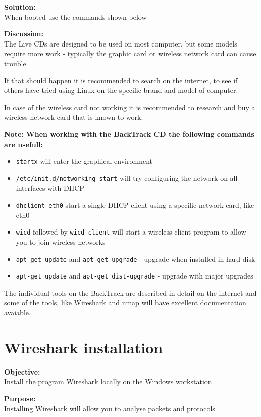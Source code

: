 \documentclass[a4paper,11pt,notitlepage]{report}
\begin{document}
{\bf Solution:}\\
When booted use the commands shown below

{\bf Discussion:}\\
The Live CDs are designed to be used on most computer, but some models
require more work - typically the graphic card or wireless network card can cause trouble.

If that should happen it is recommended to search on the internet, to see if others have tried using Linux on the specific brand and model of computer.

In case of the wireless card not working it is recommended to research and buy
a wireless network card that is known to work.

{\bf Note: When working with the BackTrack CD the following commands are usefull:}
\begin{itemize}
\item \verb+startx+ will enter the graphical environment
\item \verb+/etc/init.d/networking start+ will try configuring the network on all interfaces with DHCP
\item \verb+dhclient eth0+ start a single DHCP client using a specific network card, like eth0
\item \verb+wicd+ followed by \verb+wicd-client+ will start a wireless client program to allow you to join wireless networks
\item \verb+apt-get update+ and \verb+apt-get upgrade+ - upgrade when installed in hard disk
\item \verb+apt-get update+ and \verb+apt-get dist-upgrade+ - upgrade with major upgrades
\end{itemize}

The individual tools on the BackTrack are described in detail on the internet and some of the tools, like Wireshark and nmap will have excellent documentation avaiable.

\chapter{Wireshark installation}
\label{ex:wireshark}



{\bf Objective:}\\
Install the program Wireshark locally on the Windows workstation

{\bf Purpose:}\\
Installing Wireshark will allow you to analyse packets and protocols
\end{document}
